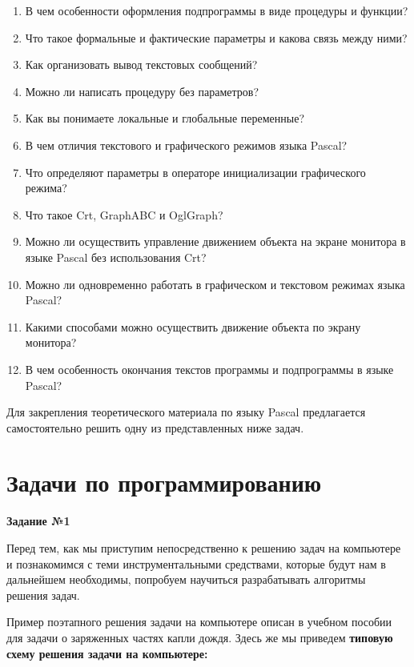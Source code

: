 \begin{enumerate}
\item В чем особенности оформления подпрограммы в виде про­цедуры и функции?
\item Что такое формальные и фактические параметры и какова связь между ними?
\item Как организовать вывод текстовых сообщений?
\item Можно ли написать процедуру без параметров?
\item Как вы понимаете локальные и глобальные переменные?
\item В чем отличия текстового и графического режимов языка Pascal?
\item Что определяют параметры в операторе инициализации гра­фического режима?
\item Что такое Crt, GraphABC и OglGraph?
\item Можно ли осуществить управление движением объекта на экране монитора в языке Pascal без использования Crt?
\item Можно ли одновременно работать в графическом и текстовом режимах языка Pascal?
\item Какими способами можно осуществить движение объекта по экрану монитора?
\item В чем особенность окончания текстов программы и подпрограммы в языке Pascal?
\end{enumerate}

Для закрепления теоретического материала по языку Pascal предлагается самостоятельно решить одну из представленных ниже задач.

\section{Задачи по программированию}

{\bf Задание №1}

Перед тем, как мы приступим непосредственно к решению задач на компьютере и познакомимся с теми инструментальными средствами, которые будут нам в дальнейшем необходимы, попро­буем научиться разрабатывать алгоритмы решения задач.

Пример поэтапного решения задачи на компьютере описан в учебном пособии для задачи о заряженных частях капли дождя. Здесь же мы приведем {\bf типовую схему решения задачи на компьютере:}
\vspace{5mm}

